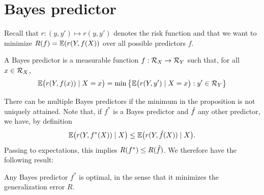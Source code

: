 %
%
%
%

\section{Bayes predictor}
\label{sec:bayes.pred}
Recall that $r: (y,y')\mapsto r(y,y')$ denotes the risk function and that we want to minimize $R(f) = \bm{\mathbb E}(r(Y, f(X))$ over all possible predictors $f$. 
\begin{definition}
\label{def:bayes.pred}
A Bayes predictor is a measurable function $f: {\mathcal R}_X \to {\mathcal R}_Y$ such that, for all $x\in {\mathcal R}_X$, 
\[
\bm{\mathbb E}\big(r(Y, f(x))\mid X=x\big) = \min\big\{\bm{\mathbb E}\big(r(Y, y')\mid X=x\big): y'\in {\mathcal R}_Y\big\}
\]
\end{definition}
There can be multiple Bayes predictors if the minimum in the proposition is not uniquely attained.
Note that, if $f^{*}$ is a Bayes predictor and ${\hat{f}}$ any other predictor, we have, by definition 
\[
\bm{\mathbb E}\big(r(Y, f^{*}(X))\mid X\big) \leq \bm{\mathbb E}\big(r(Y, {\hat{f}}(X))\mid X\big).
\]
Passing to expectations, this implies $R(f^{*}) \leq R({\hat{f}})$. We therefore have the following result:
\begin{theorem}
\label{th:bayes.pred}
Any Bayes predictor 
 $f^{*}$ is optimal, in the sense that it minimizes the generalization error $R$.
 \end{theorem}


